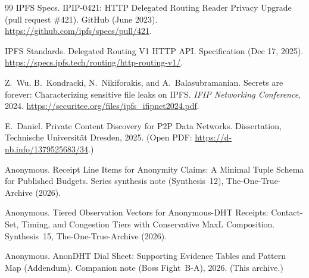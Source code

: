 \documentclass[11pt]{article}
\begin{document}
\begin{thebibliography}{99}
IPFS Specs.
\newblock IPIP-0421: HTTP Delegated Routing Reader Privacy Upgrade (pull request \#421).
\newblock GitHub (June 2023).
\newblock \url{https://github.com/ipfs/specs/pull/421}.

IPFS Standards.
\newblock Delegated Routing V1 HTTP API.
\newblock Specification (Dec 17, 2025).
\newblock \url{https://specs.ipfs.tech/routing/http-routing-v1/}.

Z.~Wu, B.~Kondracki, N.~Nikiforakis, and A.~Balasubramanian.
\newblock Secrets are forever: Characterizing sensitive file leaks on IPFS.
\newblock \emph{IFIP Networking Conference}, 2024.
\newblock \url{https://securitee.org/files/ipfs_ifipnet2024.pdf}.

E.~Daniel.
\newblock Private Content Discovery for P2P Data Networks.
\newblock Dissertation, Technische Universit\"at Dresden, 2025.
\newblock (Open PDF: \url{https://d-nb.info/1379525683/34}.)

Anonymous.
\newblock Receipt Line Items for Anonymity Claims: A Minimal Tuple Schema for Published Budgets.
\newblock Series synthesis note (Synthesis~12), The-One-True-Archive (2026).


Anonymous.
\newblock Tiered Observation Vectors for Anonymous-DHT Receipts: Contact-Set, Timing, and Congestion Tiers with Conservative MaxL Composition.
\newblock Synthesis~15, The-One-True-Archive (2026).

Anonymous.
\newblock AnonDHT Dial Sheet: Supporting Evidence Tables and Pattern Map (Addendum).
\newblock Companion note (Boss Fight~B-A), 2026. (This archive.)

\end{thebibliography}
\end{document}
